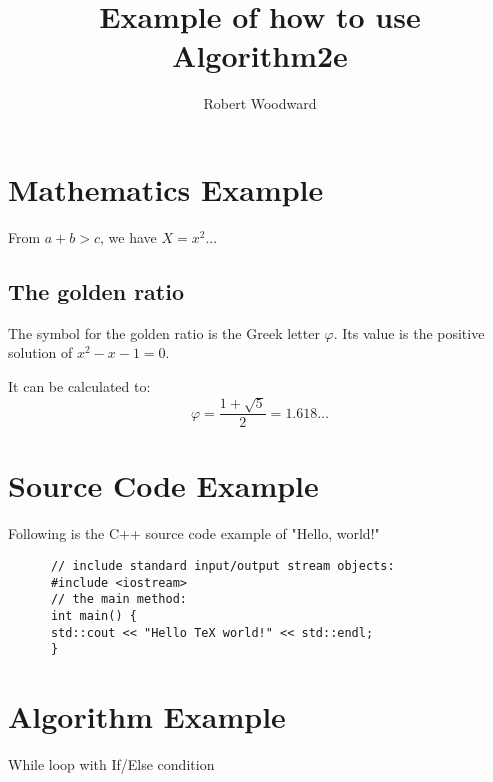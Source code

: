 \documentclass{article}
\title{Example of how to use Algorithm2e}
\author{Robert Woodward}
\begin{document}
    \maketitle
    
    \section{Mathematics Example}

    From $ a+b>c $, we have $X = x^2$...

    \subsection*{The golden ratio}
    
    The symbol for the golden ratio is the Greek letter \( \varphi \). Its value is the positive solution of \( x^2 - x - 1 = 0 \).

It can be calculated to:
\[
\varphi = \frac{1 + \sqrt{5}}{2} = 1.618 \ldots
\]

    \section{Source Code Example}

    Following is the C++ source code example of "Hello, world!"

  \begin{lstlisting}
      // include standard input/output stream objects:
      #include <iostream>
      // the main method:
      int main() {
      std::cout << "Hello TeX world!" << std::endl;
      }
  \end{lstlisting}


  \section{Algorithm Example}

 
 
\begin{algorithm}[H]
  \DontPrintSemicolon
  \SetAlgoLined
  \BlankLine
   
   
  \caption{While loop with If/Else condition}
  \end{algorithm}
\end{document}
